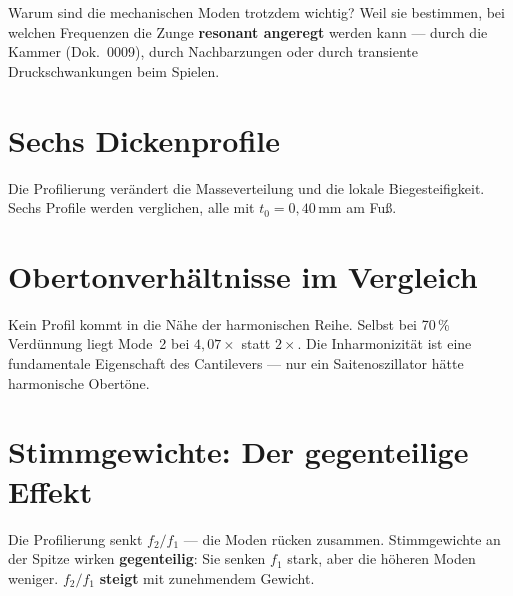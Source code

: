 \documentclass[11pt,a4paper]{article}
\begin{document}
Warum sind die mechanischen Moden trotzdem wichtig? Weil sie bestimmen,
bei welchen Frequenzen die Zunge \textbf{resonant angeregt} werden kann ---
durch die Kammer (Dok.~0009), durch Nachbarzungen oder durch transiente
Druckschwankungen beim Spielen.

\section{Sechs Dickenprofile}

Die Profilierung verändert die Masseverteilung und die lokale Biegesteifigkeit.
Sechs Profile werden verglichen, alle mit $t_0 = 0{,}40$\,mm am Fuß.

\begin{center}
\end{center}

\section{Obertonverhältnisse im Vergleich}

Kein Profil kommt in die Nähe der harmonischen Reihe. Selbst bei 70\,\%
Verdünnung liegt Mode~2 bei $4{,}07\times$ statt $2\times$. Die Inharmonizität
ist eine fundamentale Eigenschaft des Cantilevers --- nur ein Saitenoszillator
hätte harmonische Obertöne.

\section{Stimmgewichte: Der gegenteilige Effekt}

Die Profilierung senkt $f_2/f_1$ --- die Moden rücken zusammen.
Stimmgewichte an der Spitze wirken \textbf{gegenteilig}: Sie senken $f_1$ stark,
aber die höheren Moden weniger. $f_2/f_1$ \textbf{steigt} mit zunehmendem Gewicht.
\end{document}
